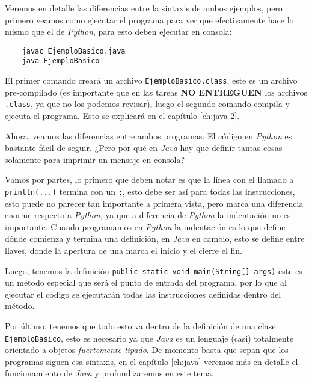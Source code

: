   Veremos en detalle las diferencias entre la sintaxis de ambos ejemplos, pero primero
  veamos como ejecutar el programa para ver que efectivamente hace lo mismo que el de 
  \textit{Python}, para esto deben ejecutar en consola:

  \begin{verbatim}
    javac EjemploBasico.java
    java EjemploBasico
  \end{verbatim}

  El primer comando creará un archivo \texttt{EjemploBasico.class}, este es un archivo
  pre-compilado (es importante que en las tareas \textbf{NO ENTREGUEN} los archivos 
  \texttt{.class}, ya que no los podemos revisar), luego el segundo comando compila y 
  ejecuta el programa.
  Esto se explicará en el capítulo \ref{ch:java-2}.

  Ahora, veamos las diferencias entre ambos programas.
  El código en \textit{Python} es bastante fácil de seguir.
  ¿Pero por qué en \textit{Java} hay que definir tantas cosas solamente para imprimir un
  mensaje en consola?

  Vamos por partes, lo primero que deben notar es que la línea con el llamado a 
  \texttt{println(...)} termina con un \texttt{;}, esto debe ser así para todas las 
  instrucciones, esto puede no parecer tan importante a primera vista, pero marca una
  diferencia enorme respecto a \textit{Python}, ya que a diferencia de \textit{Python} 
  la indentación no es importante.
  Cuando programamos en \textit{Python} la indentación es lo que define dónde comienza
  y termina una definición, en \textit{Java} en cambio, esto se define entre llaves, 
  donde la apertura de una marca el inicio y el cierre el fin.

  Luego, tenemos la definición \texttt{public static void main(String[] args)}
  este es un método especial que será el punto de entrada del programa, por lo que al 
  ejecutar el código se ejecutarán todas las instrucciones definidas dentro del método.
  
  Por último, tenemos que todo esto va dentro de la definición de una clase 
  \texttt{EjemploBasico}, esto es necesario ya que \textit{Java} es un lenguaje 
  (casi) totalmente orientado a objetos \textit{fuertemente tipado}.
  De momento basta que sepan que los programas siguen esa sintaxis, en el capítulo 
  \ref{ch:java} veremos más en detalle el funcionamiento de \textit{Java} y 
  profundizaremos en este tema.
%